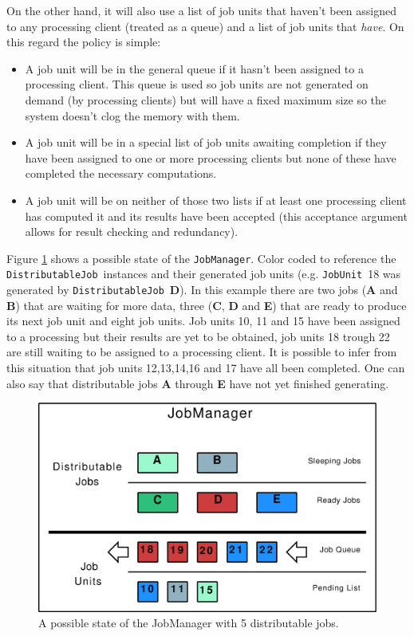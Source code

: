 \documentclass[a4paper,12pt,english]{report}
\renewcommand{\DJ}{\texttt{DistributableJob}}
\newcommand{\JU}{\texttt{JobUnit}}
\newcommand{\JM}{\texttt{JobManager}}
\begin{document}
On the other hand, it will also use a list of job units that haven't been assigned to any processing client (treated as a queue) and a list of job units that \emph{have}. On this regard the policy is simple:
\begin{itemize}
\item A job unit will be in the general queue if it hasn't been assigned to a processing client. This queue is used so job units are not generated on demand (by processing clients) but will have a fixed maximum size so the system doesn't clog the memory with them.
\item A job unit will be in a special list of job units awaiting completion if they have been assigned to one or more processing clients but none of these have completed the necessary computations.
\item A job unit will be on neither of those two lists if at least one processing client has computed it and its results have been accepted (this acceptance argument allows for result checking and redundancy).
\end{itemize}

Figure \ref{JobManager} shows a possible state of the \JM. Color coded to reference the \DJ \ instances and their generated job units (e.g. \JU \ 18 was generated by \DJ \ \textbf{D}). In this example there are two jobs (\textbf{A} and \textbf{B}) that are waiting for more data, three (\textbf{C}, \textbf{D} and \textbf{E}) that are ready to produce its next job unit and eight job units. Job units 10, 11 and 15 have been assigned to a processing but their results are yet to be obtained, job units 18 trough 22 are still waiting to be assigned to a processing client. It is possible to infer from this situation that job units 12,13,14,16 and 17 have all been completed. One can also say that distributable jobs \textbf{A} through \textbf{E} have not yet finished generating.

\begin{figure}[!ht]
\begin{center}
\includegraphics [width=13.5cm]{images/JobManager.eps}
\end{center}
\caption{A possible state of the JobManager with 5 distributable jobs.}
\label{JobManager}
\end{figure}
\end{document}
